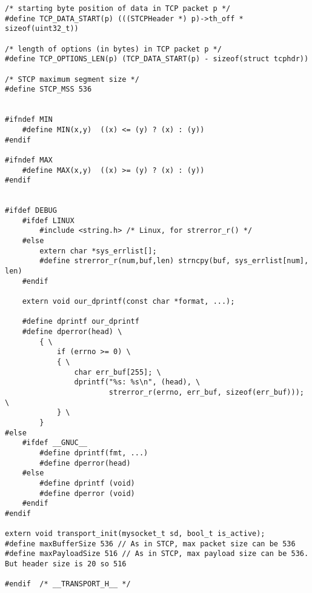\documentclass[11pt,a4paper,titlepage]{article}
\begin{document}
\begin{lstlisting}
/* starting byte position of data in TCP packet p */
#define TCP_DATA_START(p) (((STCPHeader *) p)->th_off * sizeof(uint32_t))

/* length of options (in bytes) in TCP packet p */
#define TCP_OPTIONS_LEN(p) (TCP_DATA_START(p) - sizeof(struct tcphdr))

/* STCP maximum segment size */
#define STCP_MSS 536


#ifndef MIN
    #define MIN(x,y)  ((x) <= (y) ? (x) : (y))
#endif

#ifndef MAX
    #define MAX(x,y)  ((x) >= (y) ? (x) : (y))
#endif


#ifdef DEBUG
    #ifdef LINUX
        #include <string.h> /* Linux, for strerror_r() */
    #else
        extern char *sys_errlist[];
        #define strerror_r(num,buf,len) strncpy(buf, sys_errlist[num], len)
    #endif

    extern void our_dprintf(const char *format, ...);

    #define dprintf our_dprintf
    #define dperror(head) \
        { \
            if (errno >= 0) \
            { \
                char err_buf[255]; \
                dprintf("%s: %s\n", (head), \
                        strerror_r(errno, err_buf, sizeof(err_buf))); \
            } \
        }
#else
    #ifdef __GNUC__
        #define dprintf(fmt, ...)
        #define dperror(head)
    #else
        #define dprintf (void)
        #define dperror (void)
    #endif
#endif

extern void transport_init(mysocket_t sd, bool_t is_active);
#define maxBufferSize 536 // As in STCP, max packet size can be 536
#define maxPayloadSize 516 // As in STCP, max payload size can be 536. But header size is 20 so 516

#endif  /* __TRANSPORT_H__ */

\end{lstlisting}
\end{document}
